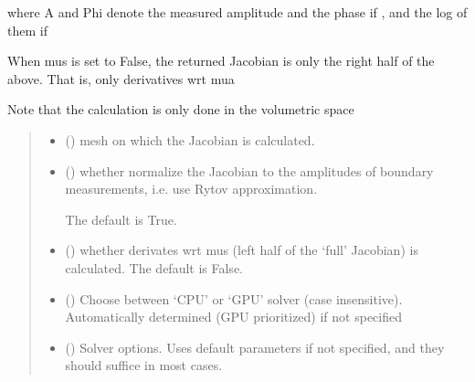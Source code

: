 \documentclass[letterpaper,10pt,english]{sphinxmanual}
\begin{document}
\begin{fulllineitems}
\sphinxAtStartPar
where A and Phi denote the measured amplitude and the phase if , and the log of them if 

\sphinxAtStartPar
When mus is set to False, the returned Jacobian is only the right half of the above. That is, only derivatives wrt mua

\sphinxAtStartPar
Note that the calculation is only done in the volumetric space
\begin{quote}\begin{description}
\begin{itemize}
\item {} 
\sphinxAtStartPar
{} () \textendash{} mesh on which the Jacobian is calculated.

\item {} 
\sphinxAtStartPar
{} (\sphinxstyleliteralemphasis{\sphinxupquote{, }}) \textendash{} 
\sphinxAtStartPar
whether normalize the Jacobian to the amplitudes of boundary measurements, i.e. use Rytov approximation.

\sphinxAtStartPar
The default is True.


\item {} 
\sphinxAtStartPar
{} (\sphinxstyleliteralemphasis{\sphinxupquote{, }}) \textendash{} whether derivates wrt mus (left half of the ‘full’ Jacobian) is calculated. The default is False.

\item {} 
\sphinxAtStartPar
{} (\sphinxstyleliteralemphasis{\sphinxupquote{, }}) \textendash{} Choose between ‘CPU’ or ‘GPU’ solver (case insensitive). Automatically determined (GPU prioritized) if not specified

\item {} 
\sphinxAtStartPar
{} ({\hyperref[\detokenize{_autosummary/nirfasterff.utils.SolverOptions:nirfasterff.utils.SolverOptions}]{}}\sphinxstyleliteralemphasis{\sphinxupquote{, }}) \textendash{} 
\sphinxAtStartPar
Solver options. Uses default parameters if not specified, and they should suffice in most cases.


\end{itemize}
\end{description}
\end{quote}
\end{fulllineitems}
\end{document}
